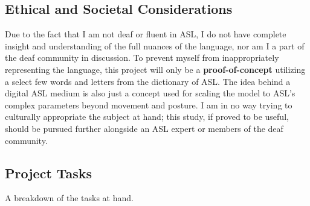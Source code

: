 \documentclass[11pt]{article}
\begin{document}
    \subsection{Ethical and Societal Considerations}
        Due to the fact that I am not deaf or fluent in ASL, I do not have complete insight and understanding of the full nuances of the language, nor am I a part of the deaf community in discussion. To prevent myself from inappropriately representing the language, this project will only be a \textbf{proof-of-concept} utilizing a select few words and letters from the dictionary of ASL. The idea behind a digital ASL medium is also just a concept used for scaling the model to ASL's complex parameters beyond movement and posture. I am in no way trying to culturally appropriate the subject at hand; this study, if proved to be useful, should be pursued further alongside an ASL expert or members of the deaf community.

    \subsection{Project Tasks}
        A breakdown of the tasks at hand.
\end{document}
